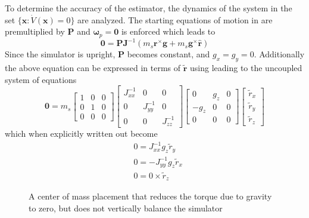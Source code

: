 To determine the accuracy of the estimator, the dynamics of the system in the set $\{\bm{x}:\dot V(\bm{x})=0 \}$ are analyzed. The starting equations of motion in  are premultiplied by $\bm{P}$ and $\bm{\omega}_p=\bm{0}$ is enforced which leads to
\begin{equation}
    \bm{0}=\bm{PJ}^{-1}(m_s\bm{r}^{\times}\bm{g}+m_s\bm{g}^\times\bm{\hat{r}}) 
\end{equation}
Since the simulator is upright, $\bm{P}$ becomes constant, and $g_x=g_y=0$. Additionally the above equation can be expressed in terms of $\tilde{\bm{r}}$ using  leading to the uncoupled system of equations
\begin{equation}
    \bm{0}=m_s\begin{bmatrix}
    1 & 0 & 0 \\ 0 & 1 & 0 \\ 0 & 0 & 0
    \end{bmatrix}
    \begin{bmatrix}
    J_{xx}^{-1} & 0 & 0 \\ 0 & J_{yy}^{-1} & 0 \\ 0 & 0 & J_{zz}^{-1}
    \end{bmatrix}
    \begin{bmatrix}
    0 & g_z & 0 \\ -g_z & 0 & 0 \\ 0 & 0 & 0
    \end{bmatrix}
    \begin{bmatrix}
    \tilde{r}_x  \\ \tilde{r}_y \\ \tilde{r}_z
    \end{bmatrix}
\end{equation}
which when explicitly written out become
\begin{subequations}
    \begin{align*}
      &0 = J_{xx}^{-1}g_z\tilde{r}_y \\
      &0 = -J_{yy}^{-1}g_z\tilde{r}_x \\
      &0 = 0\times\tilde{r}_z 
    \end{align*}
\end{subequations}


\begin{figure}
    \centering
    
    \caption{A center of mass placement that reduces the torque due to gravity to zero, but does not vertically balance the simulator}
    \label{fig:mbs_null_sol}
\end{figure}

